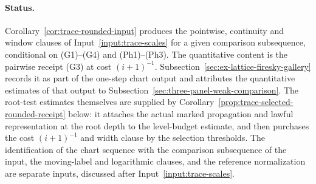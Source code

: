 \paragraph{Status.}
Corollary~\ref{cor:trace-rounded-input} produces the pointwise,
continuity and window clauses of Input~\ref{input:trace-scales} for a
given comparison subsequence, conditional on (G1)--(G4) and
(Ph1)--(Ph3). The quantitative content is the pairwise receipt (G3) at
cost $(i+1)^{-1}$. Subsection~\ref{sec:ex-lattice-firesky-gallery} records
it as part of the one-step chart output and attributes the quantitative
estimates of that output to Subsection~\ref{sec:three-panel-weak-comparison}.
The root-test estimates themselves are supplied by
Corollary~\ref{prop:trace-selected-rounded-receipt} below: it attaches
the actual marked propagation and lawful representation at the root
depth to the level-budget estimate, and then purchases the cost
$(i+1)^{-1}$ and width clause by the selection thresholds.
The identification of the chart sequence with the comparison
subsequence of the input, the moving-label and logarithmic clauses, and
the reference normalization are separate inputs, discussed after
Input~\ref{input:trace-scales}.


